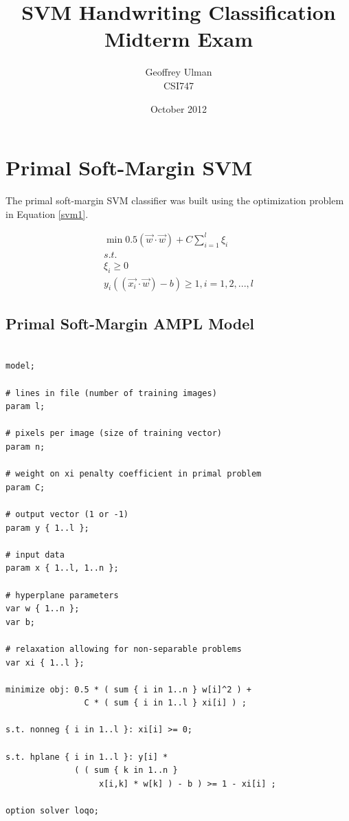 \documentclass{article}
\begin{document}
\title{SVM Handwriting Classification\\
       Midterm Exam}
\author{Geoffrey Ulman\\
        CSI747}
\date{October 2012}
\maketitle

\section{Primal Soft-Margin SVM}\label{model1}

The primal soft-margin SVM classifier was built using the optimization problem in Equation \ref{svm1}.

\begin{equation}\label{svm1}
\begin{split}
\min 0.5\left( \vec{w} \cdot \vec{w} \right) + C \sum_{i=1}^l \xi_i \\
s.t. \\
\xi_i \ge 0 \\
y_i \left( \left( \vec{x_i} \cdot \vec{w} \right) - b \right) \ge 1 , i = 1,2,...,l
\end{split}
\end{equation}

\subsection{Primal Soft-Margin AMPL Model}

\begin{verbatim}

model;

# lines in file (number of training images)
param l;

# pixels per image (size of training vector)
param n;

# weight on xi penalty coefficient in primal problem
param C;

# output vector (1 or -1)
param y { 1..l };

# input data
param x { 1..l, 1..n };

# hyperplane parameters
var w { 1..n };
var b;

# relaxation allowing for non-separable problems
var xi { 1..l };

minimize obj: 0.5 * ( sum { i in 1..n } w[i]^2 ) +
                C * ( sum { i in 1..l } xi[i] ) ;

s.t. nonneg { i in 1..l }: xi[i] >= 0;

s.t. hplane { i in 1..l }: y[i] *
              ( ( sum { k in 1..n }
                   x[i,k] * w[k] ) - b ) >= 1 - xi[i] ;

option solver loqo;

\end{verbatim}
\end{document}
